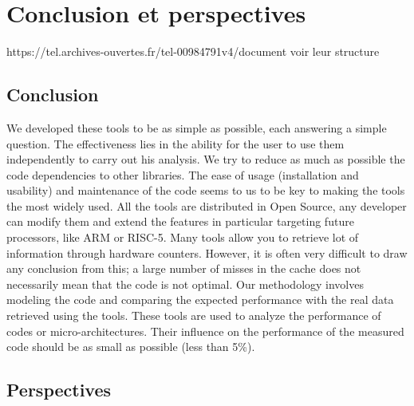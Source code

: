 \chapter{Conclusion et perspectives}
\label{chap:conclusion}

https://tel.archives-ouvertes.fr/tel-00984791v4/document
voir leur structure


\section{Conclusion}

    We developed these tools to be as simple as possible, each answering a simple question. The effectiveness lies in the ability for the user to use them independently to carry out his analysis. We try to reduce as much as possible the code dependencies to other libraries. The ease of usage (installation and usability) and maintenance of the code seems to us to be key to making the tools the most widely used. All the tools are distributed in Open Source, any developer can modify them and extend the features in particular targeting future processors, like ARM or RISC-5. Many tools allow you to retrieve lot of information through hardware counters. However, it is often very difficult to draw any conclusion from this; a large number of misses in the cache does not necessarily mean that the code is not optimal. Our methodology involves modeling the code and comparing the expected performance with the real data retrieved using the tools. 
    These tools are used to analyze the performance of codes or micro-architectures. Their influence on the performance of the measured code should be as small as possible (less than 5\%).


\section{Perspectives}



